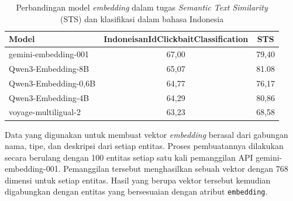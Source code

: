 \begin{table}[h]
	\centering
	\caption{Perbandingan model \textit{embedding} dalam tugas \textit{Semantic Text Similarity} (STS) dan klasifikasi dalam bahasa Indonesia \cite{enevoldsen2025MMTEBmassivemultilingualtextEmbeddingModelComp}}
	\label{tab:embedding-model-comparison}
	\begin{tabular}{|l|c|c|}
		\hline
		\textbf{Model}       & \textbf{IndoneisanIdClickbaitClassification} & \textbf{{STS}} \\
		\hline \hline
		gemini-embedding-001 & 67,00                                        & 79,40          \\
		\hline
		Qwen3-Embedding-8B   & 65,07                                        & 81.08          \\
		\hline
		Qwen3-Embedding-0,6B & 64,77                                        & 76,17          \\
		\hline
		Qwen3-Embedding-4B   & 64,29                                        & 80,86          \\
		\hline
		voyage-multiligual-2 & 63,23                                        & 68,58          \\
		\hline
	\end{tabular}
\end{table}

Data yang digunakan untuk membuat vektor \textit{embedding} berasal dari gabungan nama, tipe, dan deskripsi dari setiap entitas.
Proses pembuatannya dilakukan secara berulang dengan 100 entitas setiap satu kali pemanggilan API gemini-embedding-001.
Pemanggilan tersebut menghasilkan sebuah vektor dengan 768 dimensi untuk setiap entitas.
Hasil yang berupa vektor tersebut kemudian digabungkan dengan entitas yang bersesuaian dengan atribut \texttt{embedding}.

